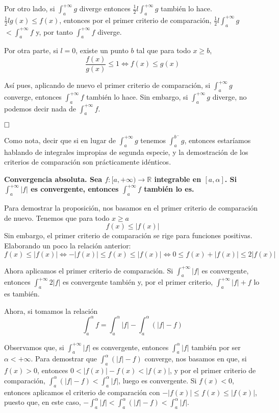 \documentclass[a4paper]{article}
\newcommand{\qed}{\begin{flushright}
		{$\newline\square$}
	\end{flushright}}
\begin{document}
Por otro lado, si $\int_a^{+\infty} g$ diverge entonces $\frac{1}{2}l\int_a^{+\infty} g$ también lo hace. $\frac{1}{2}l g(x) \le f(x)$, entonces por el primer criterio de comparación, $\frac{1}{2}l\int_a^{+\infty} g$$<\int_a^{+\infty} f$ y, por tanto $\int_a^{+\infty} f$ diverge.

Por otra parte, si $l = 0$, existe un punto $b$ tal que para todo $x\ge b$, 
$$\frac{f(x)}{g(x)} \le 1 \iff f(x) \le g(x)$$

Así pues, aplicando de nuevo el primer criterio de comparación, si $\int_a^{+\infty} g$ converge, entonces $\int_a^{+\infty} f$ también lo hace. Sin embargo, si $\int_a^{+\infty} g$ diverge, no podemos decir nada de $\int_a^{+\infty} f$.\qed

Como nota, decir que si en lugar de $\int_a^{+\infty} g$ tenemos $\int_a^{b^-} g$, entonces estaríamos hablando de integrales impropias de segunda especie, y la demostración de los criterios de comparación son prácticamente idénticos.

\textbf{Convergencia absoluta. Sea $f:[a,+\infty)\rightarrow\mathbb{R}$ integrable en $[a,\alpha]$. Si $\int_a^{+\infty} |f|$ es convergente, entonces $\int_a^{+\infty} f$ también lo es.}

Para demostrar la proposición, nos basamos en el primer criterio de comparación de nuevo. Tenemos que para todo $x\ge a$
$$f(x) \le |f(x)|$$
Sin embargo, el primer criterio de comparación se rige para funciones positivas. Elaborando un poco la relación anterior:
$$f(x) \le |f(x)| \iff -|f(x)| \le f(x) \le |f(x)| \iff 0 \le f(x) + |f(x)| \le 2|f(x)|$$

Ahora aplicamos el primer criterio de comparación. Si $\int_a^{+\infty} |f|$ es convergente, entonces $\int_a^{+\infty} 2|f|$ es convergente también y, por el primer criterio, $\int_a^{+\infty} |f| + f$ lo es también.

Ahora, si tomamos la relación 
$$\int_a^\alpha f = \int_a^\alpha |f| - \int_a^\alpha (|f| - f)$$

Observamos que, si $\int^{+\infty}_a |f|$ es convergente, entonces $\int^{\alpha}_a |f|$ también por ser $\alpha < +\infty$. Para demostrar que $\int_a^\alpha (|f| - f)$ converge, nos basamos en que, si $f(x) > 0$, entonces $0<|f(x)| - f(x) < |f(x)|$, y por el primer criterio de comparación, $\int_a^\alpha (|f| - f) < \int^{\alpha}_a |f|$, luego es convergente. Si $f(x) < 0$, entonces aplicamos el criterio de comparación con $-|f(x)| \le f(x) \le |f(x)|$, puesto que, en este caso, $-\int^{\alpha}_a |f| < \int_a^\alpha (|f| - f) < \int^{\alpha}_a |f|$. 
\end{document}
